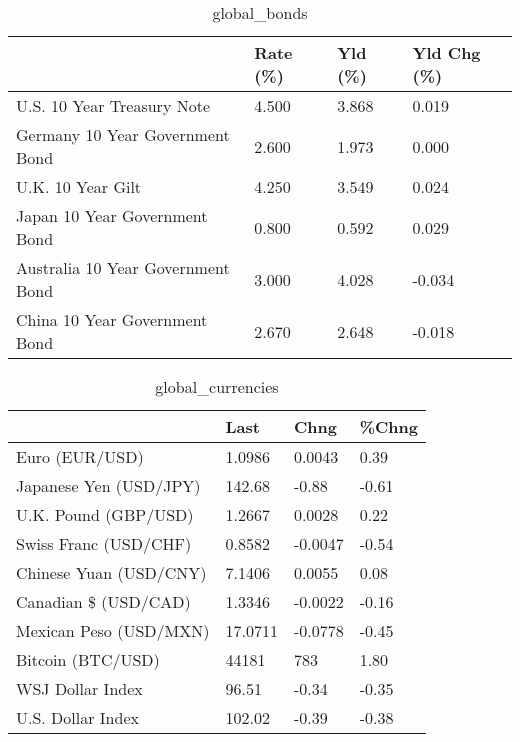 \documentclass{article}%
\begin{document}
%


\begin{table}[htbp]%
\caption{global\_bonds}%
\centering%
\begin{adjustbox}{width=1\textwidth}%
\begin{tabular}{llll}
\toprule
                                  & Rate (\%) & Yld (\%) & Yld Chg (\%) \\
\midrule
       U.S. 10 Year Treasury Note &    4.500 &   3.868 &       0.019 \\
  Germany 10 Year Government Bond &    2.600 &   1.973 &       0.000 \\
                U.K. 10 Year Gilt &    4.250 &   3.549 &       0.024 \\
    Japan 10 Year Government Bond &    0.800 &   0.592 &       0.029 \\
Australia 10 Year Government Bond &    3.000 &   4.028 &      -0.034 \\
    China 10 Year Government Bond &    2.670 &   2.648 &      -0.018 \\
\bottomrule
\end{tabular}
%
\end{adjustbox}%
\end{table}

%


\begin{table}[htbp]%
\caption{global\_currencies}%
\centering%
\begin{adjustbox}{width=1\textwidth}%
\begin{tabular}{llll}
\toprule
                       &    Last &    Chng & \%Chng \\
\midrule
        Euro (EUR/USD) &  1.0986 &  0.0043 &  0.39 \\
Japanese Yen (USD/JPY) &  142.68 &   -0.88 & -0.61 \\
  U.K. Pound (GBP/USD) &  1.2667 &  0.0028 &  0.22 \\
 Swiss Franc (USD/CHF) &  0.8582 & -0.0047 & -0.54 \\
Chinese Yuan (USD/CNY) &  7.1406 &  0.0055 &  0.08 \\
  Canadian \$ (USD/CAD) &  1.3346 & -0.0022 & -0.16 \\
Mexican Peso (USD/MXN) & 17.0711 & -0.0778 & -0.45 \\
     Bitcoin (BTC/USD) &   44181 &     783 &  1.80 \\
      WSJ Dollar Index &   96.51 &   -0.34 & -0.35 \\
     U.S. Dollar Index &  102.02 &   -0.39 & -0.38 \\
\bottomrule
\end{tabular}
%
\end{adjustbox}%
\end{table}
\end{document}
